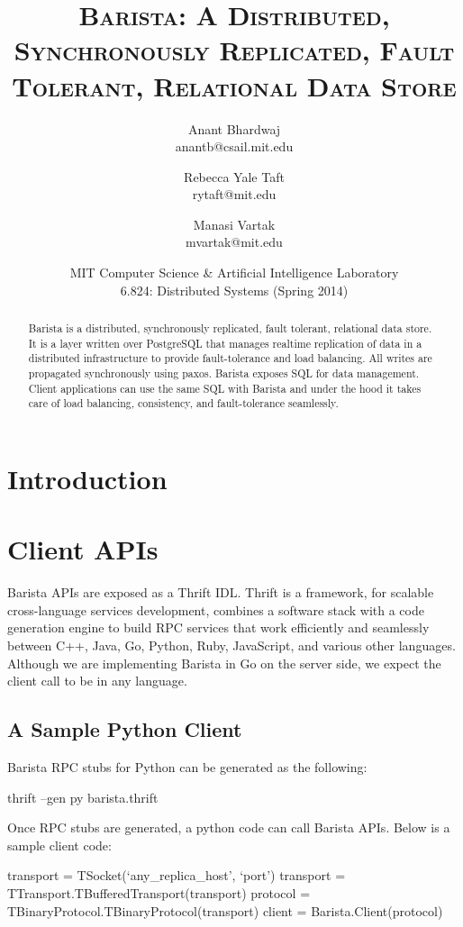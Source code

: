 \documentclass[a4paper]{article}
\title{\textsc{Barista: A Distributed, Synchronously Replicated, Fault Tolerant, Relational Data Store}}
\author{Anant Bhardwaj \\ anantb@csail.mit.edu \and Rebecca Yale Taft \\ rytaft@mit.edu \and Manasi Vartak \\ mvartak@mit.edu}
\date{MIT Computer Science \& Artificial Intelligence Laboratory \\ 6.824: Distributed Systems (Spring 2014)}
\begin{document}
\maketitle
\begin{multicols}{2}
\begin{abstract}
\noindent
Barista is a distributed, synchronously replicated, fault tolerant, relational data store. It is a layer written over PostgreSQL that manages realtime replication of data in a distributed infrastructure to provide fault-tolerance and load balancing. All writes are propagated synchronously using paxos. Barista exposes SQL for data management. Client applications can use the same SQL with Barista and under the hood it takes care of load balancing, consistency, and fault-tolerance seamlessly.
\end{abstract}
\section{Introduction}

\section{Client APIs}
\par{
Barista APIs are exposed as a Thrift IDL. Thrift is a framework, for scalable cross-language services development, combines a software stack with a code generation engine to build RPC services that work efficiently and seamlessly between C++, Java, Go, Python, Ruby, JavaScript, and various other languages. Although we are implementing Barista in Go on the server side, we expect the client call to be in any language.
}
\subsection{A Sample Python Client}
\par{
Barista RPC stubs for Python can be generated as the following:
\begin{spverbatim}
thrift --gen py barista.thrift

\end{spverbatim}
}
\par{
Once RPC stubs are generated, a python code can call Barista APIs. Below is a sample client code:
}
\par{
\tiny {
\begin{spverbatim}
transport = TSocket(`any_replica_host', `port')
transport = TTransport.TBufferedTransport(transport)
protocol = TBinaryProtocol.TBinaryProtocol(transport)
client = Barista.Client(protocol)


\end{spverbatim}}}
\end{multicols}
\end{document}
